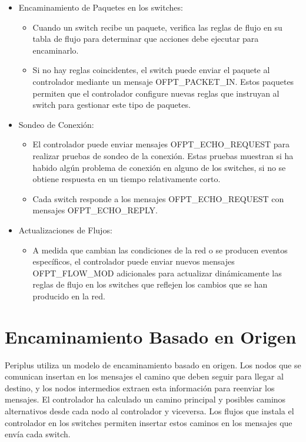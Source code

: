 \documentclass[a4paper, 12pt]{book}
\begin{document}
\begin{itemize}
		
		\item Encaminamiento de Paquetes en los switches:
		\begin{itemize}
			\item Cuando un switch recibe un paquete, verifica las reglas de flujo en su tabla de
			flujo para determinar que acciones debe ejecutar para encaminarlo.
			\item Si no hay reglas coincidentes, el switch puede enviar el paquete al controlador
			mediante un mensaje OFPT\_PACKET\_IN. Estos paquetes permiten que el controlador configure nuevas reglas que instruyan al switch para gestionar este tipo de paquetes.
		\end{itemize}
		
		\item Sondeo de Conexión:
		\sloppy
		\begin{itemize}
			\item El controlador puede enviar mensajes OFPT\_ECHO\_REQUEST para realizar pruebas de sondeo de la conexión. Estas pruebas muestran si ha habido algún problema de conexión en alguno de los switches, si no se obtiene respuesta en un tiempo relativamente corto.
		\item Cada switch responde a los mensajes OFPT\_ECHO\_REQUEST con mensajes OFPT\_ECHO\_REPLY.
		\end{itemize}
		\fussy
		
		\item Actualizaciones de Flujos:
		\begin{itemize}
			\item A medida que cambian las condiciones de la red o se producen eventos específicos,
			el controlador puede enviar nuevos mensajes OFPT\_FLOW\_MOD adicionales para actualizar
			dinámicamente las reglas de flujo en los switches que reflejen los cambios que se han producido en la red.
		\end{itemize}
	\end{itemize}
	
	\section{Encaminamiento Basado en Origen}
	Periplus utiliza un modelo de encaminamiento basado en origen. Los nodos que se comunican insertan en los mensajes el camino que deben seguir para llegar al destino, y los nodos intermedios extraen esta información para reenviar los mensajes. El controlador ha calculado un camino principal y
	posibles caminos alternativos desde cada nodo al controlador y viceversa. Los flujos que instala el controlador en los switches
	permiten insertar estos	caminos	en los mensajes	que	envía cada switch.
	
\end{document}
